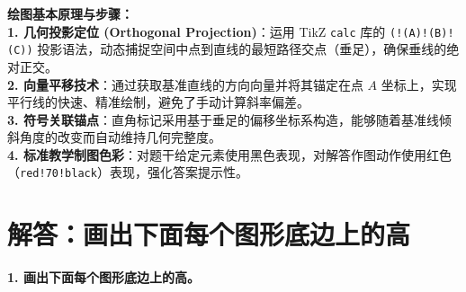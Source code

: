 \vspace{0.6cm}

{\small\color{blue!70!black}
\textbf{绘图基本原理与步骤：}\\
\textbf{1. 几何投影定位 (Orthogonal Projection)}：运用 TikZ \texttt{calc} 库的 \texttt{(!(A)!(B)!(C))} 投影语法，动态捕捉空间中点到直线的最短路径交点（垂足），确保垂线的绝对正交。\\
\textbf{2. 向量平移技术}：通过获取基准直线的方向向量并将其锚定在点 $A$ 坐标上，实现平行线的快速、精准绘制，避免了手动计算斜率偏差。\\
\textbf{3. 符号关联锚点}：直角标记采用基于垂足的偏移坐标系构造，能够随着基准线倾斜角度的改变而自动维持几何完整度。\\
\textbf{4. 标准教学制图色彩}：对题干给定元素使用黑色表现，对解答作图动作使用红色（\texttt{red!70!black}）表现，强化答案提示性。
}

\vspace{0.8cm}

\newpage


\section{解答：画出下面每个图形底边上的高}

\vspace{0.4cm}

\noindent\textbf{1. 画出下面每个图形底边上的高。}

\vspace{1.2cm}

